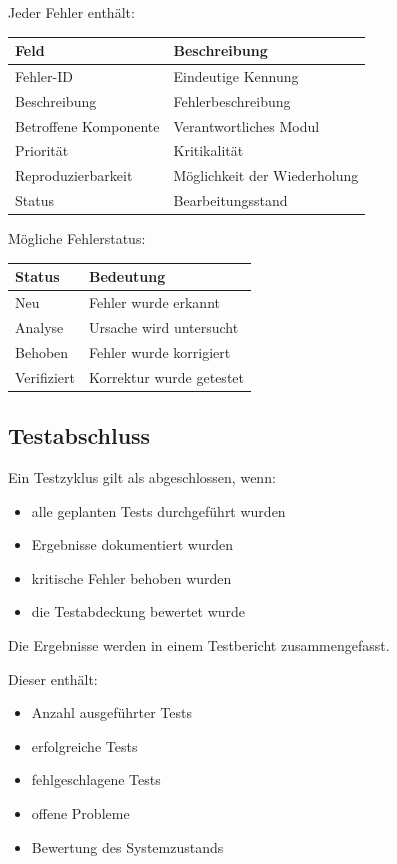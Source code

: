 Jeder Fehler enthält:

\begin{longtable}[]{@{}ll@{}}
\toprule\noalign{}
Feld & Beschreibung \\
\midrule\noalign{}
\endhead
\bottomrule\noalign{}
\endlastfoot
Fehler-ID & Eindeutige Kennung \\
Beschreibung & Fehlerbeschreibung \\
Betroffene Komponente & Verantwortliches Modul \\
Priorität & Kritikalität \\
Reproduzierbarkeit & Möglichkeit der Wiederholung \\
Status & Bearbeitungsstand \\
\end{longtable}

Mögliche Fehlerstatus:

\begin{longtable}[]{@{}ll@{}}
\toprule\noalign{}
Status & Bedeutung \\
\midrule\noalign{}
\endhead
\bottomrule\noalign{}
\endlastfoot
Neu & Fehler wurde erkannt \\
Analyse & Ursache wird untersucht \\
Behoben & Fehler wurde korrigiert \\
Verifiziert & Korrektur wurde getestet \\
\end{longtable}

\subsection{Testabschluss}\label{testabschluss}

Ein Testzyklus gilt als abgeschlossen, wenn:

\begin{itemize}
\tightlist
\item
  alle geplanten Tests durchgeführt wurden
\item
  Ergebnisse dokumentiert wurden
\item
  kritische Fehler behoben wurden
\item
  die Testabdeckung bewertet wurde
\end{itemize}

Die Ergebnisse werden in einem Testbericht zusammengefasst.

Dieser enthält:

\begin{itemize}
\tightlist
\item
  Anzahl ausgeführter Tests
\item
  erfolgreiche Tests
\item
  fehlgeschlagene Tests
\item
  offene Probleme
\item
  Bewertung des Systemzustands
\end{itemize}

